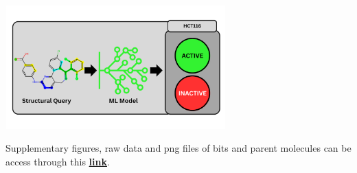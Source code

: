 \documentclass[journal=jacsat,manuscript=article]{achemso}
\begin{document}
	\begin{tocentry}
		\includegraphics[width=8.5cm,height=4.75cm]{TOC_graphical.png}
	\end{tocentry}
	
		
		\begin{suppinfo}
		
		Supplementary figures, raw data and png files of bits and parent molecules can be access through this \href{https://drive.google.com/drive/u/0/folders/1eBbbIDrqLvVmLYn7Lit_3JV7y-42jcaf}{\textbf{link}}.
		
	\end{suppinfo}
	
	
	
\end{document}
